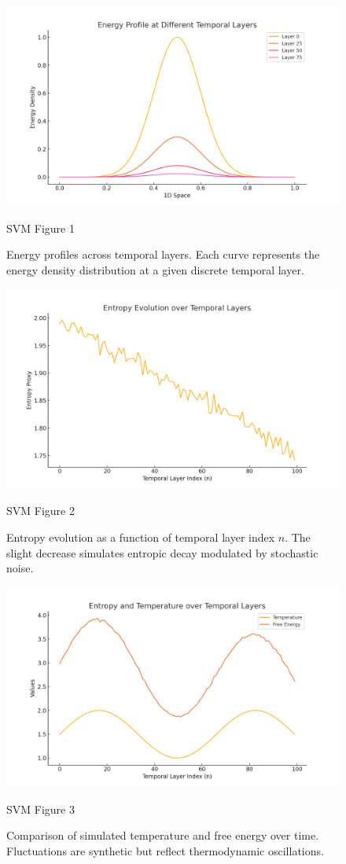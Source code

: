 \documentclass[11pt]{article}
\begin{document}
\begin{figure}[!htbp]
\centering
\centering
\includegraphics[width=0.9\linewidth]{05_Simulations/energy_profiles.png}
\caption{SVM Figure 1}
\label{fig:svm_1}
\caption{Energy profiles across temporal layers. Each curve represents the energy density distribution at a given discrete temporal layer.}
\end{figure}

\begin{figure}[h!]
\centering
\centering
\includegraphics[width=0.9\linewidth]{05_Simulations/entropy_evolution.png}
\caption{SVM Figure 2}
\label{fig:svm_2}
\caption{Entropy evolution as a function of temporal layer index $n$. The slight decrease simulates entropic decay modulated by stochastic noise.}
\end{figure}

\begin{figure}[h!]
\centering
\centering
\includegraphics[width=0.9\linewidth]{05_Simulations/temp_free_energy.png}
\caption{SVM Figure 3}
\label{fig:svm_3}
\caption{Comparison of simulated temperature and free energy over time. Fluctuations are synthetic but reflect thermodynamic oscillations.}
\end{figure}
\end{document}
